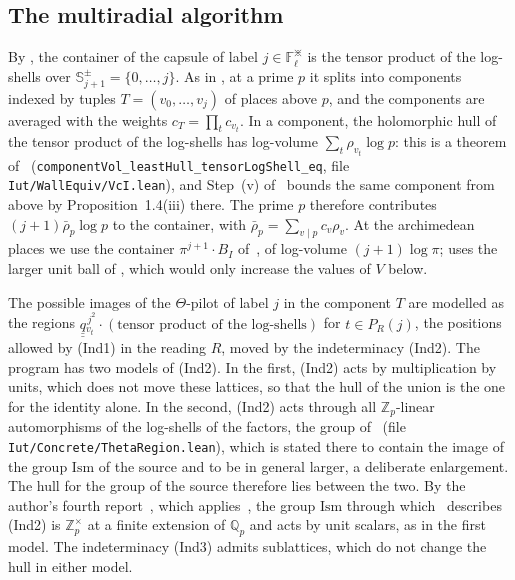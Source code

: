 \documentclass[11pt,a4paper]{article}
\newcommand{\qq}{\underline{\underline{q}}{}}
\newcommand{\F}{\mathbb{F}}
\newcommand{\Q}{\mathbb{Q}}
\newcommand{\Z}{\mathbb{Z}}
\begin{document}
\subsection{The multiradial algorithm}\label{sec:algo}
By \cite[Thm.~3.11(i)(a)]{IUT3}, the container of the capsule of label $j\in\F_\ell^\divideontimes$ is the tensor
product of the log-shells over $\mathbb{S}^\pm_{j+1}=\{0,\dots,j\}$. As in \cite[Thm.~1.10, proof,
Step~(iv)]{IUT4}, at a prime $p$ it splits into components indexed by tuples $T=(v_0,\dots,v_j)$ of places above
$p$, and the components are averaged with the weights $c_T=\prod_t c_{v_t}$. In a component, the holomorphic hull
of the tensor product of the log-shells has log-volume $\sum_t\rho_{v_t}\log p$: this is a theorem
of~\cite{LANAiut} (\nolinkurl{componentVol_leastHull_tensorLogShell_eq}, file
\nolinkurl{Iut/WallEquiv/VcI.lean}), and Step~(v) of~\cite[Thm.~1.10, proof]{IUT4} bounds the same component
from above by Proposition~1.4(iii) there. The prime $p$ therefore contributes $(j+1)\bar\rho_p\log p$ to the
container, with $\bar\rho_p=\sum_{v\mid p}c_v\rho_v$. At the archimedean places we use the container
$\pi^{j+1}\cdot B_I$ of~\cite[Thm.~1.10, proof, Step~(vii)]{IUT4}, of log-volume $(j+1)\log\pi$;
\cite{LANAiut} uses the larger unit ball of \cite[Prop.~3.2(ii)]{IUT3}, which would only increase the values of
$V$ below.

The possible images of the $\Theta$-pilot of label $j$ in the component $T$ are modelled as the regions
$\qq_{v_t}^{\,j^2}\cdot(\text{tensor product of the log-shells})$ for $t\in P_R(j)$, the positions allowed by
(Ind1) in the reading $R$, moved by the indeterminacy (Ind2). The program has two models of (Ind2). In the first,
(Ind2) acts by multiplication by units, which does not move these lattices, so that the hull of the union is the
one for the identity alone. In the second, (Ind2) acts through all $\Z_p$-linear automorphisms of the log-shells of
the factors, the group of~\cite{LANAiut} (file \nolinkurl{Iut/Concrete/ThetaRegion.lean}), which is stated there to
contain the image of the group $\mathrm{Ism}$ of the source and to be in general larger, a deliberate enlargement.
The hull for the group of the source therefore lies between the two. By the author's fourth
report~\cite[\S6, Proposition~9]{Fourth}, which applies~\cite[Thm.~F, Thm.~7.4]{MT}, the group $\mathrm{Ism}$ through
which~\cite[Thm.~3.11(i)]{IUT3} describes (Ind2) is $\Z_p^\times$ at a finite extension of $\Q_p$ and acts by unit
scalars, as in the first model. The indeterminacy (Ind3) admits sublattices,
which do not change the hull in either model.
\end{document}
